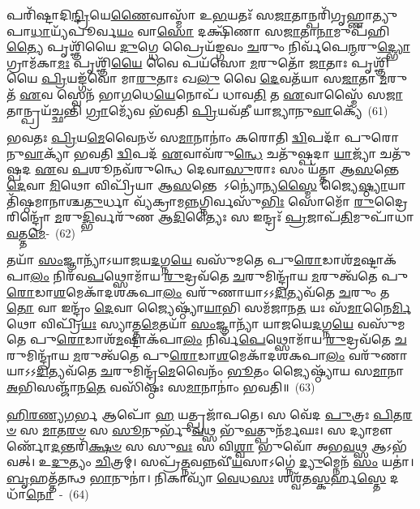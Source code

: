 𑌪𑌰𑌿᳴𑌷𑍍𑌟𑌾𑌦𑌿\-\ul{𑌨𑍍𑌦𑍍𑌰𑌿}\-𑌯𑍇\-\ul{𑌣𑍈}\-𑌵𑌾𑌸𑍍𑌮𑌾᳴ 𑌉\-\ul{𑌭}\-𑌯𑌤𑌃᳴ 𑌸\-\ul{𑌜𑌾}\-𑌤𑌾𑌨𑍍𑌪𑌰𑌿᳴\-𑌗𑍃𑌹𑍍𑌣𑌾𑌤𑍍𑌯𑍁𑌪𑌾\-\ul{𑌧𑌾}\-𑌯𑍍𑌯᳴𑌪𑍂𑌰𑍍𑌵\-\ul{𑌯𑌂} 𑌵𑌾\-\ul{𑌸𑍋} 𑌦𑌕𑍍𑌷𑌿᳴𑌣𑌾 𑌸\-\ul{𑌜𑌾}\-𑌤𑌾\-\ul{𑌨𑌾}\-𑌮𑍁𑌪᳴𑌹𑌿\-\ul{𑌤𑍍𑌯𑍈} 𑌪𑍃𑌶𑍍𑌞𑌿᳴𑌯𑍈 \ul{𑌦𑍁}\-𑌗𑍍𑌧𑍇 𑌪𑍍𑌰𑍈𑌯᳴𑌙𑍍𑌗𑌵𑌂 \ul{𑌚}\-𑌰𑍁𑌂 𑌨𑌿𑌰𑍍𑌵᳴𑌪𑍇\-\ul{𑌨𑍍𑌮}\-𑌰𑍁\-\ul{𑌦𑍍𑌭𑍍𑌯𑍋} 𑌗𑍍𑌰𑌾𑌮᳴𑌕𑌾\-\ul{𑌮𑌃} 𑌪𑍃𑌶𑍍𑌞𑌿᳴\-\ul{𑌯𑍈} 𑌵𑍈 𑌪𑌯᳴𑌸𑍋 \ul{𑌮}\-𑌰𑍁𑌤𑍋᳴ \ul{𑌜𑌾}\-𑌤𑌾𑌃 𑌪𑍃𑌶𑍍𑌞𑌿᳴𑌯𑍈 \ul{𑌪𑍍𑌰𑌿}\-𑌯𑌙𑍍𑌗᳴𑌵𑍋 𑌮𑌾\-\ul{𑌰𑍁}\-𑌤𑌾𑌃 𑌖\-\ul{𑌲𑍁} 𑌵𑍈 \ul{𑌦𑍇}\-𑌵𑌤᳴𑌯𑌾 𑌸\-\ul{𑌜𑌾}\-𑌤𑌾 \ul{𑌮}\-𑌰𑍁𑌤᳴ \ul{𑌏}\-𑌵 𑌸𑍍𑌵𑍇𑌨᳴ 𑌭𑌾\-\ul{𑌗}\-𑌧𑍇\-\ul{𑌯𑍇}\-𑌨𑍋𑌪᳴ 𑌧𑌾𑌵\-\ul{𑌤𑌿} 𑌤 \ul{𑌏}\-𑌵𑌾𑌸𑍍𑌮𑍈᳴ 𑌸\-\ul{𑌜𑌾}\-𑌤𑌾𑌨𑍍𑌪𑍍𑌰𑌯᳴𑌚𑍍𑌛𑌨𑍍𑌤𑌿 \ul{𑌗𑍍𑌰𑌾}\-𑌮𑍍𑌯𑍇᳴𑌵 𑌭᳴𑌵𑌤𑌿 \ul{𑌪𑍍𑌰𑌿}\-𑌯𑌵᳴𑌤𑍀 𑌯𑌾𑌜𑍍𑌯𑌾𑌨𑍁\-\ul{𑌵𑌾}\-𑌕𑍍𑌯𑍇᳴~(61)

𑌭𑌵𑌤𑌃 \ul{𑌪𑍍𑌰𑌿}\-𑌯\-\ul{𑌮𑍇}\-𑌵𑍈𑌨𑍞᳴ 𑌸\-\ul{𑌮𑌾}\-𑌨𑌾𑌨𑌾𑌂॑ 𑌕𑌰𑍋𑌤𑌿 \ul{𑌦𑍍𑌵𑌿}\-𑌪𑌦𑌾᳴ 𑌪𑍁𑌰𑍋𑌨𑍁\-\ul{𑌵𑌾}\-𑌕𑍍𑌯𑌾᳴ 𑌭𑌵𑌤𑌿 \ul{𑌦𑍍𑌵𑌿}\-𑌪𑌦᳴ \ul{𑌏}\-𑌵𑌾𑌵᳴\-𑌰𑍁\-\ul{𑌨𑍍𑌧𑍇} 𑌚𑌤𑍁᳴𑌷𑍍𑌪𑌦𑌾 \ul{𑌯𑌾}\-𑌜𑍍𑌯𑌾᳴ 𑌚𑌤𑍁᳴𑌷𑍍𑌪𑌦 \ul{𑌏}\-𑌵 \ul{𑌪}\-𑌶𑍂𑌨𑌵᳴\-𑌰𑍁𑌨𑍍𑌧𑍇 𑌦𑍇𑌵𑌾\-\ul{𑌸𑍁}\-𑌰𑌾𑌃 𑌸𑌂 𑌯᳴𑌤𑍍𑌤𑌾 𑌆\-\ul{𑌸}\-𑌨𑍍𑌤𑍇 \ul{𑌦𑍇}\-𑌵𑌾 \ul{𑌮𑌿}\-𑌥𑍋 𑌵𑌿𑌪𑍍𑌰𑌿᳴𑌯𑌾 𑌆\-\ul{𑌸}\-𑌨𑍍𑌤𑍇 \-𑌽𑌨𑍍𑌯𑍋॑𑌨𑍍𑌯\-\ul{𑌸𑍍𑌮𑍈} 𑌜𑍍𑌯𑍈\-\ul{𑌷𑍍𑌠𑍍𑌯𑌾}\-𑌯𑌾𑌤𑌿᳴𑌷𑍍𑌠𑌮𑌾𑌨𑌾𑌶𑍍𑌚\-\ul{𑌤𑍁}\-𑌰𑍍𑌧𑌾 𑌵𑍍𑌯᳴𑌕𑍍𑌰𑌾𑌮\-\ul{𑌨𑍍𑌨}\-𑌗𑍍𑌨𑌿𑌰𑍍𑌵𑌸𑍁᳴\-\ul{𑌭𑌿𑌃} 𑌸𑍋𑌮𑍋᳴ \ul{𑌰𑍁}\-𑌦𑍍𑌰𑍈𑌰𑌿𑌨𑍍𑌦𑍍𑌰𑍋᳴ \ul{𑌮}\-𑌰𑍁\-\ul{𑌦𑍍𑌭𑌿}\-𑌰𑍍𑌵𑌰𑍁᳴𑌣 𑌆\-\ul{𑌦𑌿}\-𑌤𑍍𑌯𑍈𑌃 𑌸 𑌇𑌨𑍍𑌦𑍍𑌰𑌃᳴ \ul{𑌪𑍍𑌰}\-𑌜𑌾𑌪᳴\-\ul{𑌤𑌿}\-𑌮𑍁𑌪𑌾᳴𑌧𑌾\-\ul{𑌵}\-𑌤𑍍𑌤\-\ul{𑌮𑍇}\--~(62)

𑌤𑌯𑌾᳴ \ul{𑌸𑌂}\-𑌜𑍍𑌞𑌾𑌨𑍍𑌯𑌾᳴\-𑌽𑌯𑌾𑌜𑌯\-\ul{𑌦}\-𑌗𑍍𑌨\-\ul{𑌯𑍇} 𑌵𑌸𑍁᳴𑌮𑌤𑍇 𑌪𑍁\-\ul{𑌰𑍋}\-𑌡𑌾𑌶᳴\-\-\ul{𑌮}\-𑌷𑍍𑌟𑌾\-𑌕᳴𑌪𑌾\-\ul{𑌲𑌂} 𑌨𑌿𑌰᳴𑌵\-\ul{𑌪}\-𑌥𑍍𑌸𑍋𑌮𑌾᳴𑌯 \ul{𑌰𑍁}\-𑌦𑍍𑌰𑌵᳴𑌤𑍇 \ul{𑌚}\-𑌰𑍁𑌮𑌿𑌨𑍍𑌦𑍍𑌰𑌾᳴𑌯 \ul{𑌮}\-𑌰𑍁𑌤𑍍𑌵᳴𑌤𑍇 𑌪𑍁\-\ul{𑌰𑍋}\-𑌡𑌾\-\ul{𑌶}\-𑌮𑍇𑌕𑌾᳴\-𑌦𑌶\-𑌕𑌪𑌾\-\ul{𑌲𑌂} 𑌵𑌰𑍁᳴𑌣𑌾𑌯𑌾\-𑌽\-𑌽\-\ul{𑌦𑌿}\-𑌤𑍍𑌯𑌵᳴𑌤𑍇 \ul{𑌚}\-𑌰𑍁𑌂 𑌤\-\ul{𑌤𑍋} 𑌵𑌾 𑌇𑌨𑍍𑌦𑍍𑌰𑌂᳴ \ul{𑌦𑍇}\-𑌵𑌾 𑌜𑍍𑌯𑍈𑌷𑍍𑌠𑍍𑌯𑌾᳴\-\ul{𑌯𑌾}\-𑌭𑌿 𑌸𑌮᳴𑌜𑌾𑌨\-\ul{𑌤} 𑌯𑌃 𑌸᳴\-\ul{𑌮𑌾}\-𑌨𑍈\-\ul{𑌰𑍍𑌮𑌿}\-𑌥𑍋 𑌵𑌿𑌪𑍍𑌰𑌿᳴\-\ul{𑌯𑌃} 𑌸𑍍𑌯𑌾𑌤𑍍𑌤\-\ul{𑌮𑍇}\-𑌤𑌯𑌾᳴ \ul{𑌸𑌂}\-𑌜𑍍𑌞𑌾𑌨𑍍𑌯𑌾᳴ 𑌯𑌾𑌜𑌯𑍇\-\ul{𑌦}\-𑌗𑍍𑌨\-\ul{𑌯𑍇} 𑌵𑌸𑍁᳴𑌮𑌤𑍇 𑌪𑍁\-\ul{𑌰𑍋}\-𑌡𑌾𑌶᳴\-\-\ul{𑌮}\-𑌷𑍍𑌟𑌾\-𑌕᳴𑌪𑌾\-\ul{𑌲𑌂} 𑌨𑌿𑌰𑍍𑌵᳴\-\ul{𑌪𑍇}\-𑌥𑍍𑌸𑍋𑌮𑌾᳴𑌯 \ul{𑌰𑍁}\-𑌦𑍍𑌰𑌵᳴𑌤𑍇 \ul{𑌚}\-𑌰𑍁𑌮𑌿𑌨𑍍𑌦𑍍𑌰𑌾᳴𑌯 \ul{𑌮}\-𑌰𑍁𑌤𑍍𑌵᳴𑌤𑍇 𑌪𑍁\-\ul{𑌰𑍋}\-𑌡𑌾\-\ul{𑌶}\-𑌮𑍇𑌕𑌾᳴\-𑌦𑌶\-𑌕𑌪𑌾\-\ul{𑌲𑌂} 𑌵𑌰𑍁᳴𑌣𑌾𑌯𑌾\-𑌽\-𑌽\-\ul{𑌦𑌿}\-𑌤𑍍𑌯𑌵᳴𑌤𑍇 \ul{𑌚}\-𑌰𑍁𑌮𑌿𑌨𑍍𑌦𑍍𑌰᳴\-\ul{𑌮𑍇}\-𑌵𑍈𑌨𑌂᳴ \ul{𑌭𑍂}\-𑌤𑌂 𑌜𑍍𑌯𑍈𑌷𑍍𑌠𑍍𑌯𑌾᳴𑌯 𑌸\-\ul{𑌮𑌾}\-𑌨𑌾 \ul{𑌅}\-𑌭𑌿𑌸𑌞𑍍𑌜𑌾᳴𑌨\-\ul{𑌤𑍇} 𑌵𑌸𑌿᳴𑌷𑍍𑌠𑌃 𑌸\-\ul{𑌮𑌾}\-𑌨𑌾𑌨𑌾𑌂॑ 𑌭𑌵𑌤𑌿॥~(63)

{\anuvakamend[{𑌵𑌿𑌶᳴\-\ul{𑌮𑍇}\-𑌵 𑌤𑌿᳴𑌷𑍍𑌠\-\ul{𑌨𑍍𑌤𑍍𑌯𑍇}\-𑌤𑌾\-\ul{𑌮𑍇}\-𑌵𑌾\-\ul{𑌥𑍈}\-𑌨𑍍𑌦𑍍𑌰𑌸𑍍𑌯᳴ 𑌯𑌾𑌜𑍍𑌯𑌾𑌨𑍁\-\ul{𑌵𑌾}\-𑌕𑍍𑌯𑍇᳴ 𑌤𑌂 𑌵𑌰𑍁᳴𑌣𑌾\-\ul{𑌯} 𑌚𑌤𑍁᳴𑌰𑍍𑌦𑌶 𑌚}]}


\-\ul{𑌹𑌿}\-\-\ul{𑌰}\-\-\ul{𑌣𑍍𑌯}\-\-\ul{𑌗}\-𑌰𑍍𑌭 𑌆𑌪𑍋᳴ \ul{𑌹} 𑌯𑌤𑍍𑌪𑍍𑌰𑌜𑌾᳴𑌪𑌤𑍇। 𑌸 𑌵𑍇᳴𑌦 \ul{𑌪𑍁}\-𑌤𑍍𑌰𑌃 \ul{𑌪𑌿}\-𑌤\-\ul{𑌰}\-\-\ul{𑍞} 𑌸 \ul{𑌮𑌾}\-𑌤\-\ul{𑌰}\-\-\ul{𑍞} 𑌸 \ul{𑌸𑍂}\-𑌨𑍁𑌰𑍍𑌭𑍁᳴\-\ul{𑌵}\-𑌥𑍍𑌸 𑌭𑍁᳴\-\ul{𑌵}\-𑌤𑍍𑌪𑍁𑌨᳴𑌰𑍍𑌮𑌘𑌃। 𑌸 𑌦𑍍𑌯𑌾𑌮𑍗𑌰𑍍𑌣𑍋᳴\-\ul{𑌦}\-𑌨𑍍𑌤𑌰𑌿᳴\-\ul{𑌕𑍍𑌷}\-\-\ul{𑍞} 𑌸 𑌸𑍁\-\ul{𑌵𑌃} 𑌸 𑌵𑌿\-\ul{𑌶𑍍𑌵𑌾} 𑌭𑍁𑌵𑍋᳴ 𑌅𑌭\-\ul{𑌵}\-𑌥𑍍𑌸 𑌆\-𑌽𑌭᳴𑌵𑌤𑍍। 𑌉\-\ul{𑌦𑍁}\-𑌤𑍍𑌯𑌂 \ul{𑌚𑌿}\-𑌤𑍍𑌰𑌮𑍍। 𑌸𑌪𑍍𑌰᳴\-\ul{𑌤𑍍𑌨}\-𑌵𑌨𑍍𑌨𑌵𑍀᳴\-\ul{𑌯}\-𑌸𑌾\-𑌽𑌗𑍍𑌨𑍇॑ \ul{𑌦𑍍𑌯𑍁}\-𑌮𑍍𑌨𑍇𑌨᳴ \ul{𑌸𑌂} 𑌯𑌤𑌾॑। \ul{𑌬𑍃}\-𑌹𑌤𑍍𑌤᳴𑌤𑌨𑍍𑌥 \ul{𑌭𑌾}\-𑌨𑍁𑌨𑌾॑। 𑌨𑌿𑌕𑌾𑌵𑍍𑌯𑌾᳴ \ul{𑌵𑍇}\-𑌧\-\ul{𑌸𑌃} 𑌶𑌶𑍍𑌵᳴𑌤\-\ul{𑌸𑍍𑌕}\-𑌰𑍍\mbox{}𑌹\-\ul{𑌸𑍍𑌤𑍇} 𑌦𑌧𑌾᳴\-\ul{𑌨𑍋}\-~-~(64)

